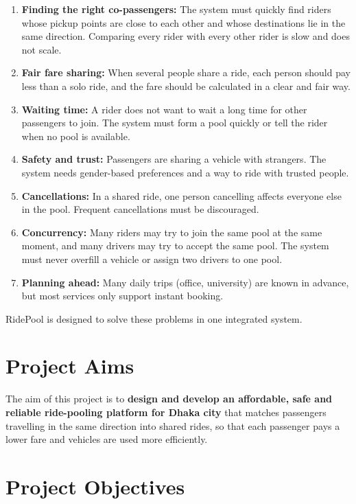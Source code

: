 \begin{enumerate}
  \item \textbf{Finding the right co-passengers:} The system must quickly find
        riders whose pickup points are close to each other and whose
        destinations lie in the same direction. Comparing every rider with
        every other rider is slow and does not scale.
  \item \textbf{Fair fare sharing:} When several people share a ride, each
        person should pay less than a solo ride, and the fare should be
        calculated in a clear and fair way.
  \item \textbf{Waiting time:} A rider does not want to wait a long time for
        other passengers to join. The system must form a pool quickly or tell
        the rider when no pool is available.
  \item \textbf{Safety and trust:} Passengers are sharing a vehicle with
        strangers. The system needs gender-based preferences and a way to ride
        with trusted people.
  \item \textbf{Cancellations:} In a shared ride, one person cancelling affects
        everyone else in the pool. Frequent cancellations must be discouraged.
  \item \textbf{Concurrency:} Many riders may try to join the same pool at the
        same moment, and many drivers may try to accept the same pool. The
        system must never overfill a vehicle or assign two drivers to one pool.
  \item \textbf{Planning ahead:} Many daily trips (office, university) are
        known in advance, but most services only support instant booking.
\end{enumerate}

RidePool is designed to solve these problems in one integrated system.

\section{Project Aims}
\label{sec:aims}

The aim of this project is to \textbf{design and develop an affordable, safe
and reliable ride-pooling platform for Dhaka city} that matches passengers
travelling in the same direction into shared rides, so that each passenger pays
a lower fare and vehicles are used more efficiently.

\section{Project Objectives}
\label{sec:objectives}


